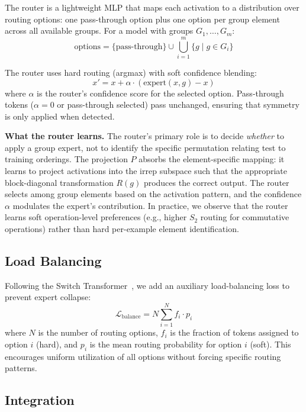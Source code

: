 \documentclass[10pt, letterpaper]{article}
\begin{document}
The router is a lightweight MLP that maps each activation to a distribution over routing options: one pass-through option plus one option per group element across all available groups. For a model with groups $G_1, \ldots, G_m$:
\begin{equation}
    \text{options} = \{{\text{pass-through}}\} \cup \bigcup_{i=1}^{m} \{g \mid g \in G_i\}
\end{equation}

The router uses hard routing (argmax) with soft confidence blending:
\begin{equation}
    x' = x + \alpha \cdot (\text{expert}(x, g) - x)
\end{equation}
where $\alpha$ is the router's confidence score for the selected option. Pass-through tokens ($\alpha = 0$ or pass-through selected) pass unchanged, ensuring that symmetry is only applied when detected.

\textbf{What the router learns.} The router's primary role is to decide \emph{whether} to apply a group expert, not to identify the specific permutation relating test to training orderings. The projection $P$ absorbs the element-specific mapping: it learns to project activations into the irrep subspace such that the appropriate block-diagonal transformation $R(g)$ produces the correct output. The router selects among group elements based on the activation pattern, and the confidence $\alpha$ modulates the expert's contribution. In practice, we observe that the router learns soft operation-level preferences (e.g., higher $S_2$ routing for commutative operations) rather than hard per-example element identification.

\subsection{Load Balancing}

Following the Switch Transformer~\cite{fedus2022switch}, we add an auxiliary load-balancing loss to prevent expert collapse:
\begin{equation}
    \mathcal{L}_{\text{balance}} = N \sum_{i=1}^{N} f_i \cdot p_i
\end{equation}
where $N$ is the number of routing options, $f_i$ is the fraction of tokens assigned to option $i$ (hard), and $p_i$ is the mean routing probability for option $i$ (soft). This encourages uniform utilization of all options without forcing specific routing patterns.

\subsection{Integration}
\end{document}
